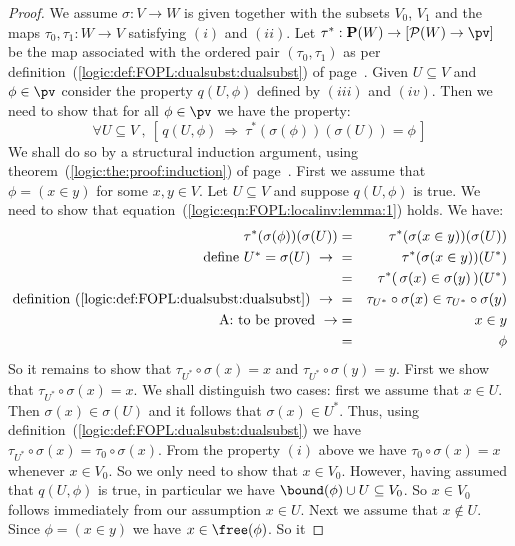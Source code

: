\begin{proof}
We assume $\sigma:V\to W$ is given together with the subsets
$V_{0}$, $V_{1}$ and the maps $\tau_{0},\tau_{1}:W\to V$ satisfying
$(i)$ and $(ii)$. Let $\tau^{*}:{\bf P}(W)\to[{\cal P}(W)\to\pv]$ be
the map associated with the ordered pair $(\tau_{0},\tau_{1})$ as
per definition~(\ref{logic:def:FOPL:dualsubst:dualsubst}) of
page~\pageref{logic:def:FOPL:dualsubst:dualsubst}. Given $U\subseteq
V$ and $\phi\in\pv$ consider the property $q(U,\phi)$ defined by
$(iii)$ and $(iv)$. Then we need to show that for all $\phi\in\pv$
we have the property:
    \[
    \forall U\subseteq V\ ,\ [\,q(U,\phi)\ \Rightarrow\
    \tau^{*}(\sigma(\phi))(\sigma(U))=\phi\,]
    \]
We shall do so by a structural induction argument, using
theorem~(\ref{logic:the:proof:induction}) of
page~\pageref{logic:the:proof:induction}. First we assume that
$\phi=(x\in y)$ for some $x, y\in V$. Let $U\subseteq V$ and suppose
$q(U,\phi)$ is true. We need to show that
equation~(\ref{logic:eqn:FOPL:localinv:lemma:1}) holds. We have:
    \begin{eqnarray*}\tau^{*}(\sigma(\phi))(\sigma(U))
        &=&\tau^{*}(\sigma(x\in y))(\sigma(U))\\
        \mbox{define $U^{*}=\sigma(U)$}\ \to\ 
        &=&\tau^{*}(\sigma(x\in y))(U^{*})\\
        &=&\tau^{*}(\,\sigma(x)\in \sigma(y)\,)(U^{*})\\
        \mbox{definition~(\ref{logic:def:FOPL:dualsubst:dualsubst})}\ \to\ 
        &=&\tau_{U^{*}}\circ\sigma(x)\in \tau_{U^{*}}\circ\sigma(y)\\
        \mbox{A: to be proved}\ \rightarrow&=&x\in y\\
        &=&\phi
    \end{eqnarray*}
So it remains to show that $\tau_{U^{*}}\circ\sigma(x)=x$ and
$\tau_{U^{*}}\circ\sigma(y)=y$. First we show that
$\tau_{U^{*}}\circ\sigma(x)=x$. We shall distinguish two cases:
first we assume that $x\in U$. Then $\sigma(x)\in\sigma(U)$ and it
follows that $\sigma(x)\in U^{*}$. Thus, using
definition~(\ref{logic:def:FOPL:dualsubst:dualsubst}) we have
$\tau_{U^{*}}\circ\sigma(x)=\tau_{0}\circ\sigma(x)$. From the
property $(i)$ above we have $\tau_{0}\circ\sigma(x)=x$ whenever
$x\in V_{0}$. So we only need to show that $x\in V_{0}$. However,
having assumed that $q(U,\phi)$ is true, in particular we have
$\bound(\phi)\cup U\subseteq V_{0}$. So $x\in V_{0}$ follows
immediately from our assumption $x\in U$. Next we assume that
$x\not\in U$. Since $\phi=(x\in y)$ we have $x\in\free(\phi)$. So it

\end{proof}

